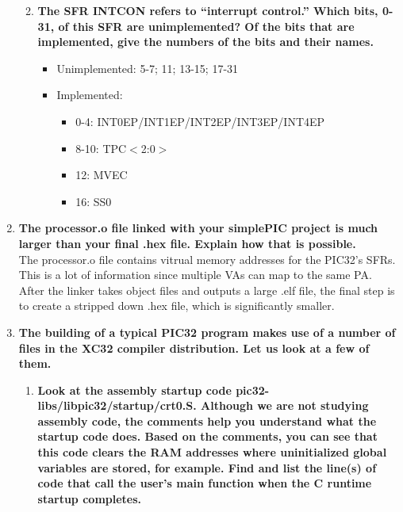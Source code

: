 \documentclass{article}
\begin{document}
\begin{enumerate}[label=\textbf{\arabic*})]
\begin{enumerate}[label=\textbf{\alph*}.]
        \pagebreak
        \item \textbf{The SFR INTCON refers to “interrupt control.” Which bits, 0-31, of this SFR are
        unimplemented? Of the bits that are implemented, give the numbers of the bits and
        their names.} \\
        \begin{itemize}
            \item Unimplemented: 5-7; 11; 13-15; 17-31
            \item Implemented:
            \begin{itemize}
                \item 0-4: INT0EP/INT1EP/INT2EP/INT3EP/INT4EP
                \item 8-10: TPC$<$2:0$>$
                \item 12: MVEC
                \item 16: SS0
            \end{itemize}
        \end{itemize}
    
    \end{enumerate}

    \setcounter{enumi}{6}
    \item \textbf{The processor.o file linked with your simplePIC project is much larger than your final
    .hex file. Explain how that is possible.} \\

    The processor.o file contains vitrual memory addresses for the PIC32's SFRs. This is a lot of information
    since multiple VAs can map to the same PA. After the linker takes object files and outputs a large .elf file, 
    the final step is to create a stripped down .hex file, which is significantly smaller.

    \item \textbf{The building of a typical PIC32 program makes use of a number of files in the XC32
    compiler distribution. Let us look at a few of them.} \\

    \begin{enumerate}[label=\textbf{\alph*}.]
        \item \textbf{Look at the assembly startup code pic32-libs/libpic32/startup/crt0.S. Although
        we are not studying assembly code, the comments help you understand what the
        startup code does. Based on the comments, you can see that this code clears the RAM
        addresses where uninitialized global variables are stored, for example. Find and list
        the line(s) of code that call the user’s main function when the C runtime startup
        completes.}


\end{enumerate}
\end{enumerate}
\end{document}
